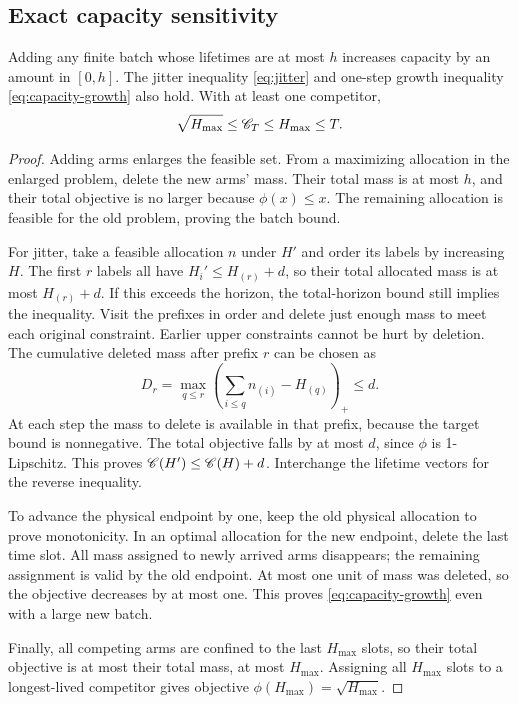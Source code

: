 \subsection{Exact capacity sensitivity}
\begin{proposition}\label{prop:stability}
Adding any finite batch whose lifetimes are at most $h$ increases capacity by an amount in $[0,h]$. The jitter inequality \eqref{eq:jitter} and one-step growth inequality \eqref{eq:capacity-growth} also hold. With at least one competitor,
\[
 \sqrt{H_{\max}}\le\mathscr C_T\le H_{\max}\le T.
\]
\end{proposition}
\begin{proof}
Adding arms enlarges the feasible set. From a maximizing allocation in the enlarged problem, delete the new arms' mass. Their total mass is at most $h$, and their total objective is no larger because $\phi(x)\le x$. The remaining allocation is feasible for the old problem, proving the batch bound.

For jitter, take a feasible allocation $n$ under $H'$ and order its labels by increasing $H$. The first $r$ labels all have $H_i'\le H_{(r)}+d$, so their total allocated mass is at most $H_{(r)}+d$. If this exceeds the horizon, the total-horizon bound still implies the inequality. Visit the prefixes in order and delete just enough mass to meet each original constraint. Earlier upper constraints cannot be hurt by deletion. The cumulative deleted mass after prefix $r$ can be chosen as
\[
 D_r=\max_{q\le r}\left(\sum_{i\le q}n_{(i)}-H_{(q)}\right)_+\le d.
\]
At each step the mass to delete is available in that prefix, because the target bound is nonnegative. The total objective falls by at most $d$, since $\phi$ is 1-Lipschitz. This proves $\mathscr C(H')\le\mathscr C(H)+d$. Interchange the lifetime vectors for the reverse inequality.

To advance the physical endpoint by one, keep the old physical allocation to prove monotonicity. In an optimal allocation for the new endpoint, delete the last time slot. All mass assigned to newly arrived arms disappears; the remaining assignment is valid by the old endpoint. At most one unit of mass was deleted, so the objective decreases by at most one. This proves \eqref{eq:capacity-growth} even with a large new batch.

Finally, all competing arms are confined to the last $H_{\max}$ slots, so their total objective is at most their total mass, at most $H_{\max}$. Assigning all $H_{\max}$ slots to a longest-lived competitor gives objective $\phi(H_{\max})=\sqrt{H_{\max}}$.
\end{proof}

